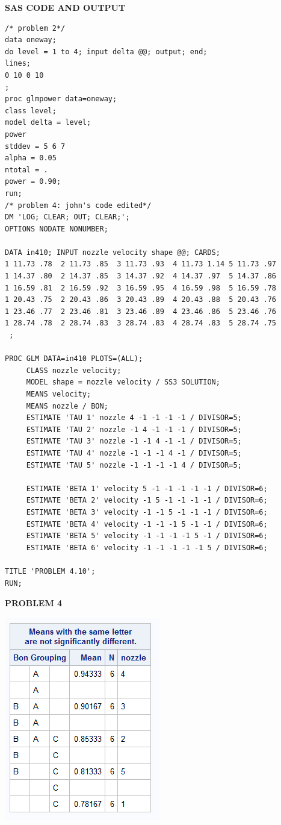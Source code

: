 \documentclass{article}\usepackage[]{graphicx}\usepackage[]{color}
\begin{document}
{\bf SAS CODE AND OUTPUT}
\begin{verbatim}
/* problem 2*/
data oneway;
do level = 1 to 4; input delta @@; output; end;
lines;
0 10 0 10
;
proc glmpower data=oneway;
class level;
model delta = level;
power
stddev = 5 6 7
alpha = 0.05
ntotal = .
power = 0.90;
run;
/* problem 4: john's code edited*/
DM 'LOG; CLEAR; OUT; CLEAR;';
OPTIONS NODATE NONUMBER;

DATA in410; INPUT nozzle velocity shape @@; CARDS;
1 11.73 .78  2 11.73 .85  3 11.73 .93  4 11.73 1.14 5 11.73 .97
1 14.37 .80  2 14.37 .85  3 14.37 .92  4 14.37 .97  5 14.37 .86
1 16.59 .81  2 16.59 .92  3 16.59 .95  4 16.59 .98  5 16.59 .78
1 20.43 .75  2 20.43 .86  3 20.43 .89  4 20.43 .88  5 20.43 .76
1 23.46 .77  2 23.46 .81  3 23.46 .89  4 23.46 .86  5 23.46 .76
1 28.74 .78  2 28.74 .83  3 28.74 .83  4 28.74 .83  5 28.74 .75
 ;

PROC GLM DATA=in410 PLOTS=(ALL);
     CLASS nozzle velocity;
     MODEL shape = nozzle velocity / SS3 SOLUTION;
     MEANS velocity;
     MEANS nozzle / BON;
     ESTIMATE 'TAU 1' nozzle 4 -1 -1 -1 -1 / DIVISOR=5;
     ESTIMATE 'TAU 2' nozzle -1 4 -1 -1 -1 / DIVISOR=5;
     ESTIMATE 'TAU 3' nozzle -1 -1 4 -1 -1 / DIVISOR=5;
     ESTIMATE 'TAU 4' nozzle -1 -1 -1 4 -1 / DIVISOR=5;
     ESTIMATE 'TAU 5' nozzle -1 -1 -1 -1 4 / DIVISOR=5;

     ESTIMATE 'BETA 1' velocity 5 -1 -1 -1 -1 -1 / DIVISOR=6;
     ESTIMATE 'BETA 2' velocity -1 5 -1 -1 -1 -1 / DIVISOR=6;
     ESTIMATE 'BETA 3' velocity -1 -1 5 -1 -1 -1 / DIVISOR=6;
     ESTIMATE 'BETA 4' velocity -1 -1 -1 5 -1 -1 / DIVISOR=6;
     ESTIMATE 'BETA 5' velocity -1 -1 -1 -1 5 -1 / DIVISOR=6;
     ESTIMATE 'BETA 6' velocity -1 -1 -1 -1 -1 5 / DIVISOR=6;

TITLE 'PROBLEM 4.10';
RUN;
\end{verbatim}

{\bf PROBLEM 4}

\includegraphics{prob4bon}
\end{document}
